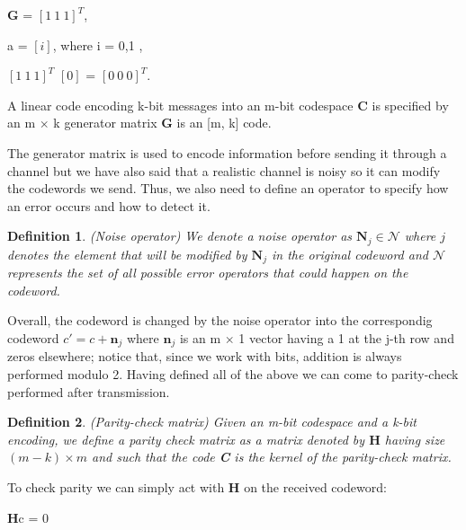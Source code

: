\documentclass{Configuration_Files/PoliMi3i_thesis}
\newtheorem{definition}{Definition}[chapter]
\begin{document}
\begin{center}
	\textbf{G} = $[1 \ 1 \ 1]^{T}$,  
\end{center}
\begin{center}
	a = $[i]$, where i = 0,1 ,
\end{center}
\begin{center}
	$[1 \ 1 \ 1]^{T}$ $[0]$ = $[0 \ 0 \ 0]^{T}$.
\end{center}

A linear code encoding k-bit messages into an m-bit codespace \textbf{C} is specified by an m $\times$ k generator matrix {\bf G} is an [m, k] code.\newline

The { generator matrix} is used to encode information before sending it through a channel but we have also said that a realistic channel is noisy so it can modify the codewords we send. Thus, we also need to define an operator to specify how an error occurs and how to detect it. 

\begin{definition}(Noise operator)
	We denote a noise operator as $\textbf{N}_j \in \mathcal{N}$ where $j$ denotes the element that will be modified by $\textbf{N}_j$ in the original codeword and $\mathcal{N}$  represents the set of all possible error operators that could happen on the codeword. 
\end{definition} 

Overall, the codeword is changed by the noise operator into the correspondig codeword $c' =c + \textbf{n}_j$ where $\textbf{n}_j$ is an m $\times$ 1 vector having a 1 at the j-th row and zeros elsewhere; notice that, since we work with bits, addition is always performed modulo 2.\newline
Having defined all of the above we can come to parity-check performed after transmission.

\begin{definition}(Parity-check matrix)
	Given an m-bit codespace and a k-bit encoding, we define a parity check matrix as a matrix denoted by $\textbf{H}$ having size $(m - k)\times m $ and such that the code {\bf C} is the kernel of the parity-check matrix. 
\end{definition}

To check parity we can simply act with {\bf H} on the received codeword: 

\begin{center}
	\textbf{H}c = 0  
\end{center}
\end{document}
